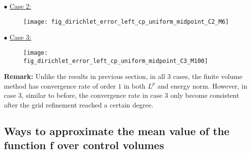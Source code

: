 \documentclass{article}
\begin{document}
	\noindent$\bullet$ \underline{Case 2:}
	\begin{figure}[H]
		\centering	\texttt{[image: fig\_dirichlet\_error\_left\_cp\_uniform\_midpoint\_C2\_M6]}
	\end{figure}

	\noindent$\bullet$ \underline{Case 3:}
	\begin{figure}[H]
		\centering	\texttt{[image: fig\_dirichlet\_error\_left\_cp\_uniform\_midpoint\_C3\_M100]}
	\end{figure}
	\noindent\textbf{Remark:} Unlike the results in previous section, in all 3 cases, the finite volume method has convergence rate of order $1$ in both $L^p$ and energy norm. However, in case 3, similar to before, the convergence rate in case 3 only become consistent after the grid refinement reached a certain degree.
	\newpage

	\subsection{Ways to approximate the mean value of the function f over control volumes}
\end{document}

